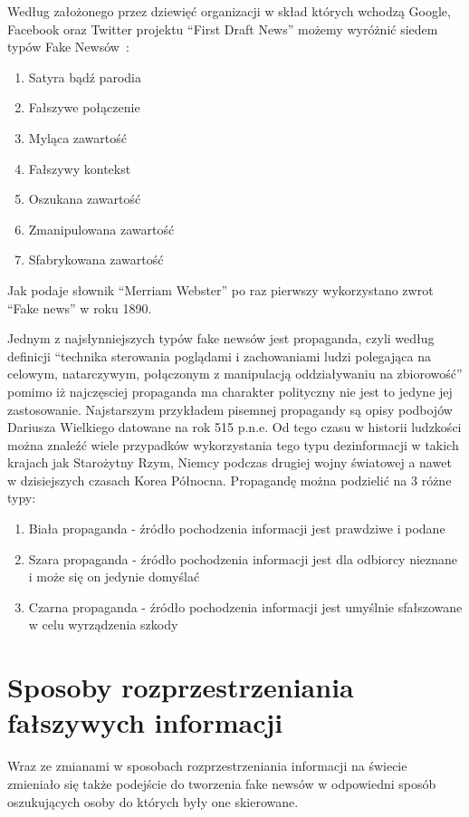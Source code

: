 Według założonego przez dziewięć organizacji w skład których wchodzą 
Google, Facebook oraz Twitter projektu ``First Draft News''
możemy wyróżnić siedem typów Fake Newsów~\cite{TypesOfFakeNews}:
\begin{enumerate}
    \item Satyra bądź parodia
    \item Fałszywe połączenie
    \item Myląca zawartość
    \item Fałszywy kontekst
    \item Oszukana zawartość
    \item Zmanipulowana zawartość
    \item Sfabrykowana zawartość
\end{enumerate}
Jak podaje słownik ``Merriam Webster'' po raz pierwszy wykorzystano zwrot
``Fake news'' w roku 1890.


Jednym z najsłynniejszych typów fake newsów jest propaganda, czyli według 
definicji ``technika sterowania poglądami i zachowaniami ludzi polegająca na 
celowym, natarczywym, połączonym z manipulacją oddziaływaniu na zbiorowość''
pomimo iż najczęsciej propaganda ma charakter polityczny nie jest to jedyne 
jej zastosowanie. Najstarszym przykładem pisemnej propagandy są opisy podbojów
Dariusza Wielkiego datowane na rok 515 p.n.e. Od tego czasu w historii ludzkości
można znaleźć wiele przypadków wykorzystania tego typu dezinformacji w takich krajach
jak Starożytny Rzym, Niemcy podczas drugiej wojny światowej a nawet w dzisiejszych 
czasach Korea Północna.
Propagandę można podzielić na 3 różne typy:
\begin{enumerate}
    \item Biała propaganda - źródło pochodzenia informacji jest prawdziwe i podane
    \item Szara propaganda - źródło pochodzenia informacji jest dla odbiorcy nieznane i może się on jedynie domyślać
    \item Czarna propaganda - źródło pochodzenia informacji jest umyślnie sfałszowane w celu wyrządzenia szkody 
\end{enumerate}


\section{Sposoby rozprzestrzeniania fałszywych informacji}
Wraz ze zmianami w sposobach rozprzestrzeniania informacji na świecie zmieniało się
także podejście do tworzenia fake newsów w odpowiedni sposób oszukujących osoby do których 
były one skierowane. 


